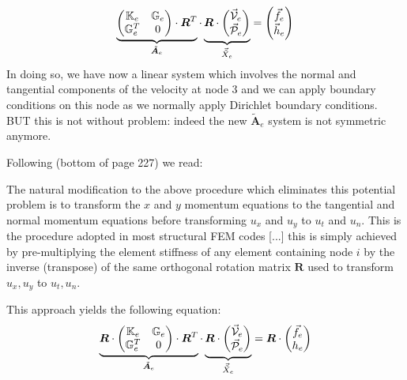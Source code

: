 \[
\underbrace{
\begin{pmatrix}
{\mathbb{K}}_e & {\mathbb{G}}_e \\
{\mathbb{G}}_e^T & 0 
\end{pmatrix}
\cdot
{\bm R}^T }_{\tilde{\bm A}_e}
\cdot
\underbrace{{\bm R} \cdot
\begin{pmatrix}
\vec{\cal V}_e \\ \vec{\cal P}_e
\end{pmatrix}}_{\vec{\tilde X}_e}
=
\begin{pmatrix}
\vec{f}_e \\ \vec{h}_{e}
\end{pmatrix}
\]
In doing so, we have now a linear system which involves the normal and tangential components 
of the velocity at node 3 and we can apply boundary conditions on this node as we normally apply
Dirichlet boundary conditions.
BUT this is not without problem: indeed the new $\tilde{\bm A}_e$ system is not symmetric anymore.

Following \cite{ensg82} (bottom of page 227) we read:
\begin{displayquote}
{\color{darkgray}
The natural modification to the above procedure which eliminates this potential problem
is to transform the $x$ and $y$ momentum equations to the tangential and normal momentum
equations before transforming $u_x$ and $u_y$ to $u_t$ and $u_n$. This is the procedure adopted in most
structural FEM codes [...] this is simply achieved by pre-multiplying the element stiffness of any element
containing node $i$ by the inverse (transpose) of the same orthogonal rotation matrix ${\bm R}$ used
to transform $u_x,u_y$ to $u_t,u_n$.}
\end{displayquote}

This approach yields the following equation:
\begin{equation}
\underbrace{
{\bm R}\cdot
\begin{pmatrix}
{\mathbb{K}}_e & {\mathbb{G}}_e \\
{\mathbb{G}}_e^T & 0 
\end{pmatrix}
\cdot
{\bm R}^T }_{\tilde{\bm A}_e}
\cdot
\underbrace{{\bm R} \cdot
\begin{pmatrix}
\vec{\cal V}_e \\ \vec{\cal P}_e
\end{pmatrix}}_{\vec{\tilde X}_e}
=
{\bm R}\cdot
\begin{pmatrix}
\vec{f}_e \\ h_{e}
\end{pmatrix}
\label{bcfs3}
\end{equation}

